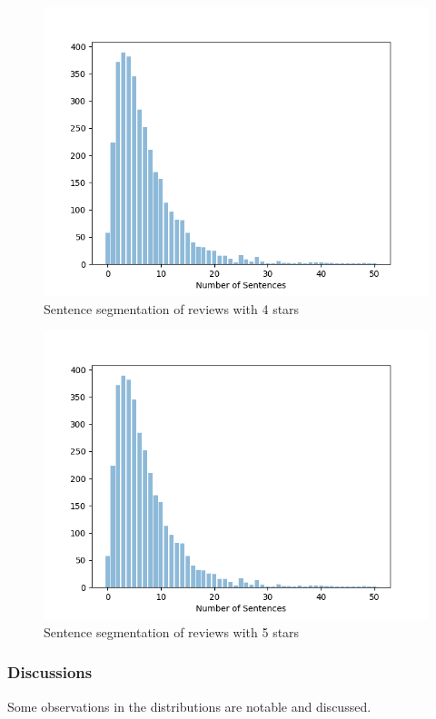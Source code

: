 \documentclass[sigconf]{acmart}
\begin{document}
\begin{figure}[ht]
  \centering
  \includegraphics[width=\linewidth]{segmentation_4star.png}
  \caption{Sentence segmentation of reviews with 4 stars}
  \label{fig:seg_4star}
\end{figure}

\begin{figure}[ht]
  \centering
  \includegraphics[width=\linewidth]{segmentation_4star.png}
  \caption{Sentence segmentation of reviews with 5 stars}
  \label{fig:seg_5star}
\end{figure}

\subsubsection{Discussions} Some observations in the distributions are notable and discussed. 
\end{document}

